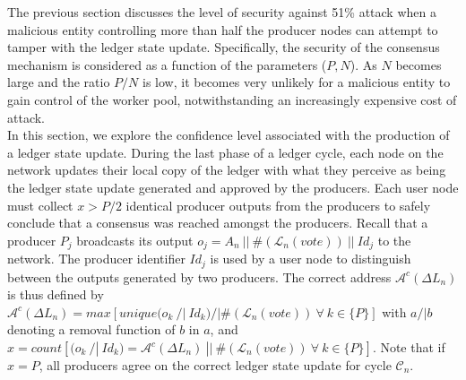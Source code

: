 The previous section discusses the level of security against 51\% attack when a malicious entity controlling more than half the producer nodes can attempt to tamper with the ledger state update. Specifically, the security of the consensus mechanism is considered as a function of the parameters ($P,N$). As $N$ becomes large and the ratio $P/N$ is low, it becomes very unlikely for a malicious entity to gain control of the worker pool, notwithstanding an increasingly expensive cost of attack. \\

In this section, we explore the confidence level associated with the production of a ledger state update. During the last phase of a ledger cycle, each node on the network updates their local copy of the ledger with what they perceive as being the ledger state update generated and approved by the producers. Each user node must collect $x > P/2$ identical producer outputs from the producers to safely conclude that a consensus was reached amongst the producers. Recall that a producer $P_j$ broadcasts its output $o_{j} = A_n~||~\#(\mathcal{L}_{n}(vote))~||~Id_j$ to the network. The producer identifier $Id_j$ is used by a user node to distinguish between the outputs generated by two producers. The correct address $\mathcal{A}^c(\Delta L_n)$ is thus defined by $\mathcal{A}^c(\Delta L_n) = max[unique(o_k~/|~Id_k)/|\#(\mathcal{L}_{n}(vote))~\forall~k\in\{P\}]$ with $a/|b$ denoting a removal function of $b$ in $a$, and $x = count[(o_k~/|~Id_k) = \mathcal{A}^c(\Delta L_n)~||~\#(\mathcal{L}_{n}(vote))~\forall~k\in\{P\}]$. Note that if $x=P$, all producers agree on the correct ledger state update for cycle $\mathcal{C}_n$. \\

